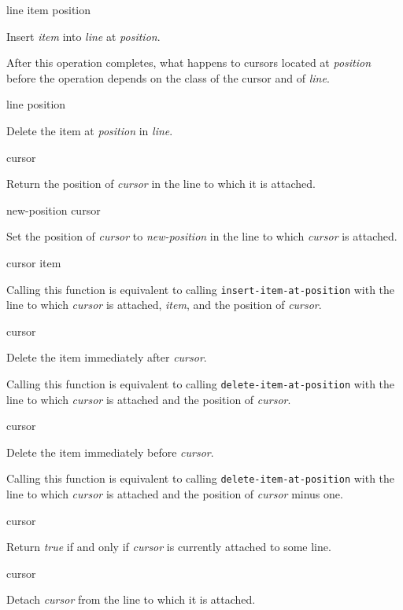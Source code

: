  {line item position}

\vskip 1mm\noindent
Insert \textit{item} into \textit{line} at \textit{position}.

After this operation completes, what happens to cursors located at
\textit{position} before the operation depends on the class of the
cursor and of \textit{line}.

 {line position}

\vskip 1mm\noindent
Delete the item at \textit{position} in \textit{line}.

 {cursor}

\vskip 1mm\noindent
Return the position of \textit{cursor} in the line to which it is
attached.

 {new-position cursor}

\vskip 1mm\noindent
Set the position of \textit{cursor} to \textit{new-position} in the
line to which \textit{cursor} is attached.

 {cursor item}

\vskip 1mm\noindent
Calling this function is equivalent to calling
\texttt{insert-item-at-position} with the line to which
\textit{cursor} is attached, \textit{item}, and the position of
\textit{cursor}.

 {cursor}

\vskip 1mm\noindent
Delete the item immediately after \emph{cursor}.

Calling this function is equivalent to calling
\texttt{delete-item-at-position} with the line to which
\textit{cursor} is attached and the position of \textit{cursor}.

 {cursor}

\vskip 1mm\noindent
Delete the item immediately before \emph{cursor}.

Calling this function is equivalent to calling
\texttt{delete-item-at-position} with the line to which
\textit{cursor} is attached and the position of \textit{cursor} minus
one.

 {cursor}

\vskip 1mm\noindent
Return \emph{true} if and only if \textit{cursor} is currently
attached to some line.

 {cursor}

\vskip 1mm\noindent
Detach \textit{cursor} from the line to which it is attached.

